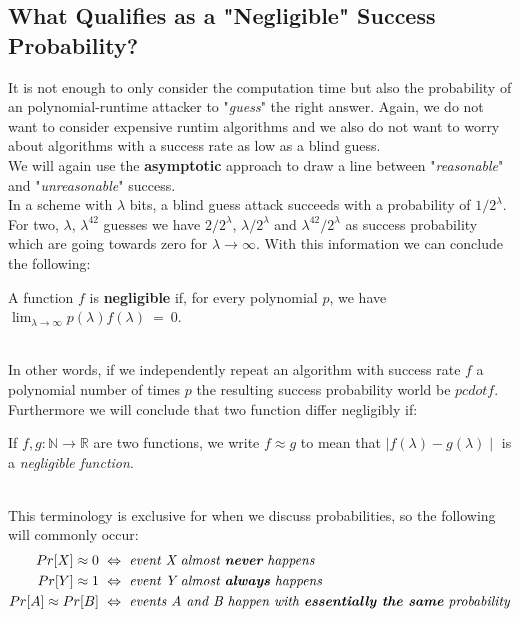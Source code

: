 \documentclass{article}
\begin{document}
\begin{adjustwidth}{2em}{}
		\subsection{What Qualifies as a "Negligible" Success Probability?}
			\begin{adjustwidth}{2em}{4em}
				It is not enough to only consider the computation time but also the probability of an polynomial-runtime attacker to "\textit{guess}" the right answer. Again, we do not want to consider expensive runtim algorithms and we also do not want to worry about algorithms with a success rate as low as a blind guess. \\
				We will again use the \textbf{asymptotic} approach to draw a line between "\textit{reasonable}" and "\textit{unreasonable}" success. \\
				In a scheme with $\lambda$ bits, a blind guess attack succeeds with a probability of $1/2^{\lambda}$. For two, $\lambda$, $\lambda^{42}$ guesses we have $2/2^{\lambda}$, $\lambda/2^{\lambda}$ and $\lambda^{42}/2^{\lambda}$ as success probability which are going towards zero for $\lambda \rightarrow \infty$. With this information we can conclude the following: \\
				\begin{center}
					A function $f$ is \textbf{negligible} if, for every polynomial $p$, we have $\lim_{\lambda \rightarrow \infty} p(\lambda) f(\lambda) \ = \ 0$.
				\end{center} 
				\hfill \\
				In other words, if we independently repeat an algorithm with success rate $f$ a polynomial number of times $p$ the resulting success probability world be $p cdot f$. \\
				Furthermore we will conclude that two function differ negligibly if: \\
				\begin{center}
					If $f,g: \mathbb{N} \rightarrow \mathbb{R}$ are two functions, we write $f \approx g$ to mean that $\mid f(\lambda) - g(\lambda) \mid$ is a \textit{negligible function}.
				\end{center}
				\hfill \\
				This terminology is exclusive for when we discuss probabilities, so the following will commonly occur:
				\begin{align*}
					Pr[X] \approx 0 \ & \Leftrightarrow \ \textit{event X almost \textbf{never} happens} \\
					Pr[Y] \approx 1 \ & \Leftrightarrow \ \textit{event Y almost \textbf{always} happens} \\
					Pr[A] \approx Pr[B] \ & \Leftrightarrow \ \textit{events A and B happen with \textbf{essentially the same} probability}
				\end{align*}
			\end{adjustwidth}

\end{adjustwidth}
\end{document}
